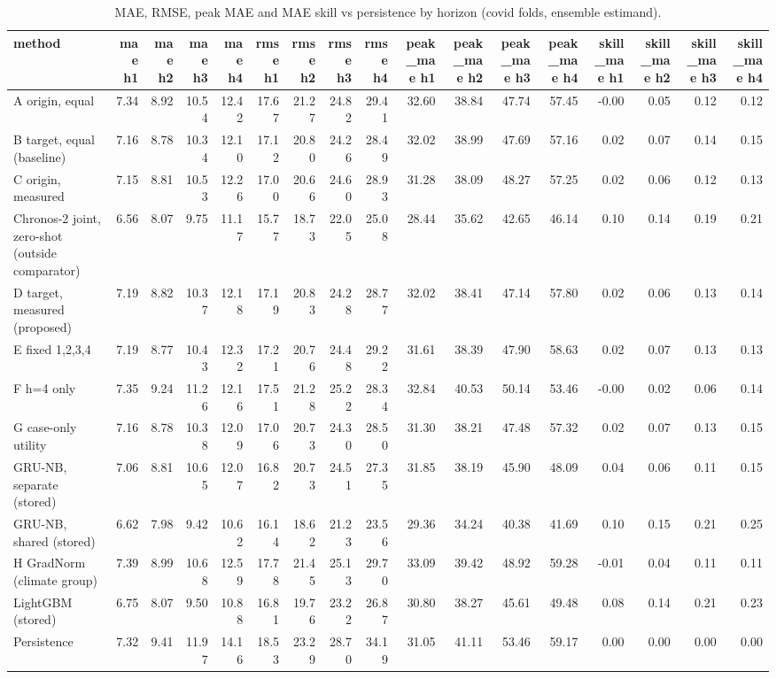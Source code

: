 \begin{table}[t]
\centering
\small
\caption{MAE, RMSE, peak MAE and MAE skill vs persistence by horizon (covid folds, ensemble estimand).}
\label{tab:metrics-covid-ensemble}
\begin{tabular}{lrrrrrrrrrrrrrrrr}
\toprule
method & mae h1 & mae h2 & mae h3 & mae h4 & rmse h1 & rmse h2 & rmse h3 & rmse h4 & peak\_mae h1 & peak\_mae h2 & peak\_mae h3 & peak\_mae h4 & skill\_mae h1 & skill\_mae h2 & skill\_mae h3 & skill\_mae h4 \\
\midrule
A origin, equal & 7.34 & 8.92 & 10.54 & 12.42 & 17.67 & 21.27 & 24.82 & 29.41 & 32.60 & 38.84 & 47.74 & 57.45 & -0.00 & 0.05 & 0.12 & 0.12 \\
B target, equal (baseline) & 7.16 & 8.78 & 10.34 & 12.10 & 17.12 & 20.80 & 24.26 & 28.49 & 32.02 & 38.99 & 47.69 & 57.16 & 0.02 & 0.07 & 0.14 & 0.15 \\
C origin, measured & 7.15 & 8.81 & 10.53 & 12.26 & 17.00 & 20.66 & 24.60 & 28.93 & 31.28 & 38.09 & 48.27 & 57.25 & 0.02 & 0.06 & 0.12 & 0.13 \\
Chronos-2 joint, zero-shot (outside comparator) & 6.56 & 8.07 & 9.75 & 11.17 & 15.77 & 18.73 & 22.05 & 25.08 & 28.44 & 35.62 & 42.65 & 46.14 & 0.10 & 0.14 & 0.19 & 0.21 \\
D target, measured (proposed) & 7.19 & 8.82 & 10.37 & 12.18 & 17.19 & 20.83 & 24.28 & 28.77 & 32.02 & 38.41 & 47.14 & 57.80 & 0.02 & 0.06 & 0.13 & 0.14 \\
E fixed 1,2,3,4 & 7.19 & 8.77 & 10.43 & 12.32 & 17.21 & 20.76 & 24.48 & 29.22 & 31.61 & 38.39 & 47.90 & 58.63 & 0.02 & 0.07 & 0.13 & 0.13 \\
F h=4 only & 7.35 & 9.24 & 11.26 & 12.16 & 17.51 & 21.28 & 25.22 & 28.34 & 32.84 & 40.53 & 50.14 & 53.46 & -0.00 & 0.02 & 0.06 & 0.14 \\
G case-only utility & 7.16 & 8.78 & 10.38 & 12.09 & 17.06 & 20.73 & 24.30 & 28.50 & 31.30 & 38.21 & 47.48 & 57.32 & 0.02 & 0.07 & 0.13 & 0.15 \\
GRU-NB, separate (stored) & 7.06 & 8.81 & 10.65 & 12.07 & 16.82 & 20.73 & 24.51 & 27.35 & 31.85 & 38.19 & 45.90 & 48.09 & 0.04 & 0.06 & 0.11 & 0.15 \\
GRU-NB, shared (stored) & 6.62 & 7.98 & 9.42 & 10.62 & 16.14 & 18.62 & 21.23 & 23.56 & 29.36 & 34.24 & 40.38 & 41.69 & 0.10 & 0.15 & 0.21 & 0.25 \\
H GradNorm (climate group) & 7.39 & 8.99 & 10.68 & 12.59 & 17.78 & 21.45 & 25.13 & 29.70 & 33.09 & 39.42 & 48.92 & 59.28 & -0.01 & 0.04 & 0.11 & 0.11 \\
LightGBM (stored) & 6.75 & 8.07 & 9.50 & 10.88 & 16.81 & 19.76 & 23.22 & 26.87 & 30.80 & 38.27 & 45.61 & 49.48 & 0.08 & 0.14 & 0.21 & 0.23 \\
Persistence & 7.32 & 9.41 & 11.97 & 14.16 & 18.53 & 23.29 & 28.70 & 34.19 & 31.05 & 41.11 & 53.46 & 59.17 & 0.00 & 0.00 & 0.00 & 0.00 \\
\bottomrule
\end{tabular}
\end{table}

